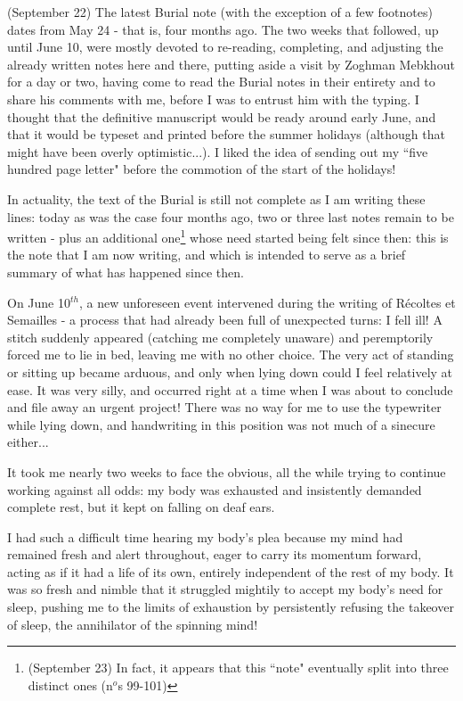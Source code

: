 \label{note:98}(September 22) The latest Burial note (with the exception of a few footnotes) dates from May 24 - that is, four months ago. The two weeks that followed, up until June 10, were mostly devoted to re-reading, completing, and adjusting the already written notes here and there, putting aside a visit by Zoghman Mebkhout for a day or two, having come to read the Burial notes in their entirety and to share his comments with me, before I was to entrust him with the typing. I thought that the definitive manuscript would be ready around early June, and that it would be typeset and printed before the summer holidays (although that might have been overly optimistic...). I liked the idea of sending out my ``five hundred page letter" before the commotion of the start of the holidays!

In actuality, the text of the Burial is still not complete as I am writing these lines: today as was the case four months ago, two or three last notes remain to be written - plus an additional one\footnote{(September 23) In fact, it appears that this ``note" eventually split into three distinct ones (n$^o$s 99-101)} whose need started being felt since then: this is the note that I am now writing, and which is intended to serve as a brief summary of what has happened since then. 

On June 10$^{th}$, a new unforeseen event intervened during the writing of R\'ecoltes et Semailles - a process that had already been full of unexpected turns: I fell ill! A stitch suddenly appeared (catching me completely unaware) and peremptorily forced me to lie in bed, leaving me with no other choice. The very act of standing or sitting up became arduous, and only when lying down could I feel relatively at ease. It was very silly, and occurred right at a time when I was about to conclude and file away an urgent project! There was no way for me to use the typewriter while lying down, and handwriting in this position was not much of a sinecure either...

It took me nearly two weeks to face the obvious, all the while trying to continue working against all odds: my body was exhausted and insistently demanded complete rest, but it kept on falling on deaf ears.

I had such a difficult time hearing my body's plea because my mind had remained fresh and alert throughout, eager to carry its momentum forward, acting as if it had a life of its own, entirely independent of the rest of my body. It was so fresh and nimble that it struggled mightily to accept my body's need for sleep, pushing me to the limits of exhaustion by persistently refusing the takeover of sleep, the annihilator of the spinning mind!

